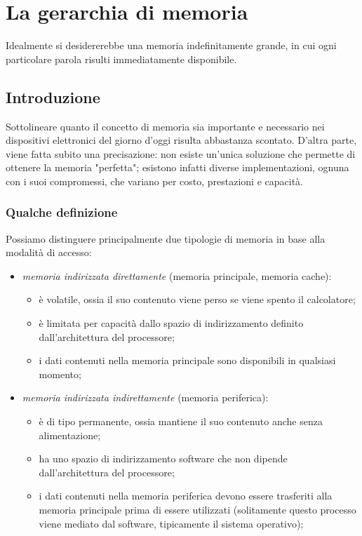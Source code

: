 \documentclass[class=book, crop=false, oneside]{standalone}
\begin{document}
\chapter{La gerarchia di memoria}\begin{fquote}Idealmente si desidererebbe una memoria indefinitamente grande, in cui ogni particolare parola risulti immediatamente disponibile.
\end{fquote}

\section{Introduzione}
Sottolineare quanto il concetto di memoria sia importante e necessario nei dispositivi elettronici del giorno d'oggi risulta abbastanza scontato. D'altra parte, viene fatta subito una precisazione: non esiste un'unica soluzione che permette di ottenere la memoria "perfetta"; esistono infatti diverse implementazioni, ognuna con i suoi compromessi, che variano per costo, prestazioni e capacità.

\subsection*{Qualche definizione}
Possiamo distinguere principalmente due tipologie di memoria in base alla modalità di accesso:
\begin{itemize}
	\item \emph{memoria indirizzata direttamente} (memoria principale, memoria cache):
	\begin{itemize}
		\item è volatile, ossia il suo contenuto viene perso se viene spento il calcolatore;
		\item è limitata per capacità dallo spazio di indirizzamento definito dall'architettura del processore;
		\item i dati contenuti nella memoria principale sono disponibili in qualsiasi momento;
	\end{itemize}
	\item \emph{memoria indirizzata indirettamente} (memoria periferica):
	\begin{itemize}
		\item è di tipo permanente, ossia mantiene il suo contenuto anche senza alimentazione;
		\item ha uno spazio di indirizzamento software che non dipende dall'architettura del processore;
		\item i dati contenuti nella memoria periferica devono essere trasferiti alla memoria principale prima di essere utilizzati (solitamente questo processo viene mediato dal software, tipicamente il sistema operativo);
	\end{itemize}
\end{itemize}
\end{document}
